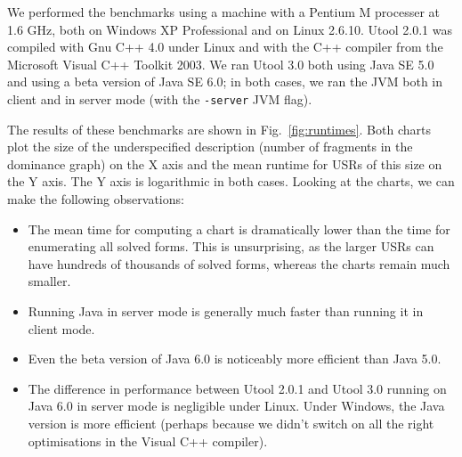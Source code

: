 We performed the benchmarks using a machine with a Pentium M processer
at 1.6 GHz, both on Windows XP Professional and on Linux 2.6.10. Utool
2.0.1 was compiled with Gnu C++ 4.0 under Linux and with the C++
compiler from the Microsoft Visual C++ Toolkit 2003. We ran Utool 3.0
both using Java SE 5.0 and using a beta version of Java SE 6.0; in
both cases, we ran the JVM both in client and in server mode (with the
\verb?-server? JVM flag).

The results of these benchmarks are shown in
Fig.~\ref{fig:runtimes}. Both charts plot the size of the
underspecified description (number of fragments in the dominance
graph) on the X axis and the mean runtime for USRs of this size on the
Y axis. The Y axis is logarithmic in both cases. Looking at the
charts, we can make the following observations:
\begin{itemize}
\item The mean time for computing a chart is dramatically lower than
the time for enumerating all solved forms. This is unsurprising, as
the larger USRs can have hundreds of thousands of solved forms,
whereas the charts remain much smaller.
\item Running Java in server mode is generally much faster than
running it in client mode.
\item Even the beta version of Java 6.0 is noticeably more efficient
than Java 5.0.
\item The difference in performance between Utool 2.0.1 and Utool 3.0
running on Java 6.0 in server mode is negligible under Linux. Under
Windows, the Java version is more efficient (perhaps because we didn't
switch on all the right optimisations in the Visual C++ compiler).
\end{itemize}










